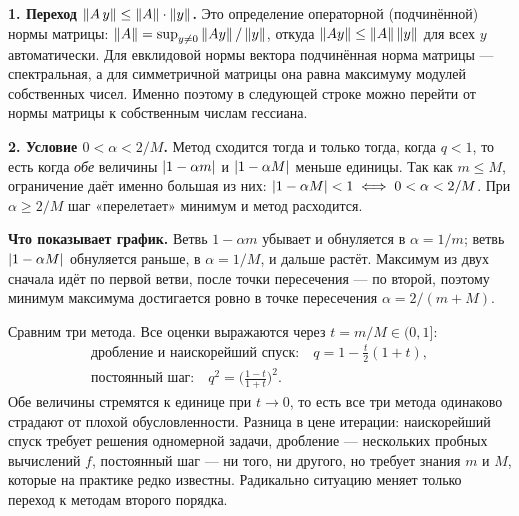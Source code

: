 
\begin{idea}[title={Два места в доказательстве, которые стоит разобрать}]
\textbf{1. Переход $\left\lVert A\,y \right\rVert \le \left\lVert A \right\rVert\cdot\left\lVert y \right\rVert$.} Это определение
операторной (подчинённой) нормы матрицы:
$\left\lVert A \right\rVert = \sup_{y \ne 0} \left\lVert Ay \right\rVert / \left\lVert y \right\rVert$, откуда
$\left\lVert Ay \right\rVert \le \left\lVert A \right\rVert\left\lVert y \right\rVert$ для всех $y$ автоматически. Для евклидовой
нормы вектора подчинённая норма матрицы — спектральная, а для симметричной
матрицы она равна максимуму модулей собственных чисел. Именно поэтому в
следующей строке можно перейти от нормы матрицы к собственным числам гессиана.

\medskip
\textbf{2. Условие $0 < \alpha < 2/M$.} Метод сходится тогда и только тогда,
когда $q < 1$, то есть когда \emph{обе} величины $\left\lvert 1 - \alpha m \right\rvert$ и
$\left\lvert 1 - \alpha M \right\rvert$ меньше единицы. Так как $m \le M$, ограничение даёт именно
большая из них: $\left\lvert 1 - \alpha M \right\rvert < 1 \iff 0 < \alpha < 2/M$. При
$\alpha \ge 2/M$ шаг «перелетает» минимум и метод расходится.

\medskip
\textbf{Что показывает график.} Ветвь $1 - \alpha m$ убывает и обнуляется в
$\alpha = 1/m$; ветвь $\left\lvert 1 - \alpha M \right\rvert$ обнуляется раньше, в $\alpha = 1/M$,
и дальше растёт. Максимум из двух сначала идёт по первой ветви, после точки
пересечения — по второй, поэтому минимум максимума достигается ровно в точке
пересечения $\alpha = 2/(m+M)$.
\end{idea}

\begin{idea}
Сравним три метода. Все оценки выражаются через $t = m/M \in (0,1]$:
\begin{gather*}
  \text{дробление и наискорейший спуск:} \quad q = 1 - \tfrac{t}{2}(1+t) , \\
  \text{постоянный шаг:} \quad q^2 = \Big(\frac{1-t}{1+t}\Big)^2 .
\end{gather*}
Обе величины стремятся к единице при $t \to 0$, то есть все три метода одинаково
страдают от плохой обусловленности. Разница в цене итерации: наискорейший спуск
требует решения одномерной задачи, дробление — нескольких пробных вычислений
$f$, постоянный шаг — ни того, ни другого, но требует знания $m$ и $M$, которые
на практике редко известны. Радикально ситуацию меняет только переход к методам
второго порядка.
\end{idea}
